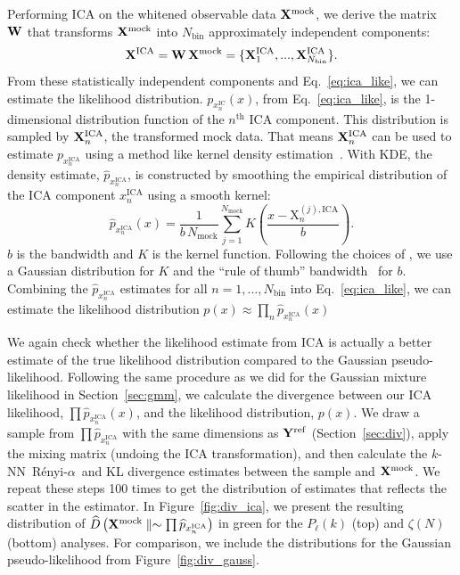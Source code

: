 \documentclass[12pt, letterpaper, preprint]{aastex6}
\newcommand{\Nd}{{100}\xspace}
\newcommand{\beq}{\begin{equation}}
\newcommand{\eeq}{\end{equation}}
\newcommand{\Xmock}{{\bf X}^\mathrm{mock}}
\newcommand{\Yref}{{\bf Y}^\mathrm{ref}}
\newcommand{\Ralpha}{R\'enyi-$\alpha$}
\newcommand{\ica}{{\small{ICA}}\xspace}
\begin{document}
Performing ICA on the whitened observable data $\Xmock$, we derive the 
matrix ${\bf W}$ that transforms $\Xmock$ into $N_\mathrm{bin}$
approximately independent components: 
\beq
{\bf X}^\mathrm{ICA} = {\bf W}\,\Xmock = \{{\bf X}^\mathrm{ICA}_1, ..., {\bf X}^\mathrm{ICA}_{N_\mathrm{bin}}\}.
\eeq
From these statistically independent components and Eq.~\ref{eq:ica_like}, 
we can estimate the likelihood distribution. $p_{x^\mathrm{IC}_n} (x)$, 
from Eq.~\ref{eq:ica_like}, is the 1-dimensional distribution 
function of the $n^\mathrm{th}$ ICA component. This distribution 
is sampled by ${\bf X}^\mathrm{ICA}_n$, the transformed mock data. 
That means ${\bf X}^\mathrm{ICA}_n$ can be used to estimate 
$p_{x^\mathrm{ICA}_n}$ using a method like kernel 
density estimation~\citep[KDE;][]{9780387848587,feigelson2012}. 
With KDE, the density estimate, $\widehat{p}_{x^\mathrm{ICA}_n}$, is constructed by 
smoothing the empirical distribution of the ICA component $x^\mathrm{ICA}_n$ 
using a smooth kernel: 
\beq
\widehat{p}_{x^\mathrm{ICA}_n}(x) = \frac{1}{b\,N_\mathrm{mock}} \sum\limits_{j=1}^{N_\mathrm{mock}} K \left( \frac{x - \mathrm{X}^{(j),\mathrm{ICA}}_n}{b} \right). 
\eeq
$b$ is the bandwidth and $K$ is the kernel function. Following the 
choices of \cite{hartlap2009}, we use a Gaussian distribution for $K$ and the 
``rule of thumb'' bandwidth~\cite[also known as Scott's rule;][]{scott1992,davison2008} 
for $b$. Combining the $\widehat{p}_{x^\mathrm{ICA}_n}$ estimates for 
all $n = 1, ..., N_\mathrm{bin}$ into Eq.~\ref{eq:ica_like}, we 
can estimate the likelihood distribution $p(x) \approx \prod\limits_n \widehat{p}_{x^\mathrm{ICA}_n}(x)$

We again check whether the likelihood estimate from \ica is actually 
a better estimate of the true likelihood distribution compared to the Gaussian 
pseudo-likelihood. Following the same procedure as we 
did for the Gaussian mixture likelihood in Section~\ref{sec:gmm}, we 
calculate the divergence between our ICA likelihood, $\prod \widehat{p}_{x^\mathrm{ICA}_n}(x)$, 
and the likelihood distribution, $p(x)$. We draw a sample from 
$\prod \widehat{p}_{x^\mathrm{ICA}_n}$ with the same dimensions as 
$\Yref$ (Section~\ref{sec:div}), apply the mixing matrix 
(undoing the \ica transformation), and then calculate the 
$k$-NN~\Ralpha~and KL divergence estimates between the sample and $\Xmock$. 
We repeat these steps \Nd times to get the distribution of estimates 
that reflects the scatter in the estimator. In Figure~\ref{fig:div_ica}, 
we present the resulting distribution of 
$\widehat{D}\left(\Xmock \parallel \sim \prod \widehat{p}_{x^\mathrm{ICA}_n} \right)$
in green for the $P_\ell(k)$ (top) and $\zeta(N)$ (bottom) analyses. 
For comparison, we include the distributions for the Gaussian pseudo-likelihood
from Figure~\ref{fig:div_gauss}. 
\end{document}
